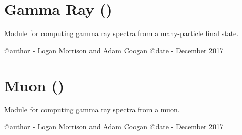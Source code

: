 \documentclass[letterpaper,10pt,english]{sphinxmanual}
\begin{document}
\section{Gamma Ray ()}
\label{\detokenize{modules:module-hazma.gamma_ray}}\label{\detokenize{modules:gamma-ray-hazma-gamma-ray}}
Module for computing gamma ray spectra from a many-particle final state.

@author - Logan Morrison and Adam Coogan
@date - December 2017


\section{Muon ()}
\label{\detokenize{modules:muon-hazma-muon}}\label{\detokenize{modules:module-hazma.muon}}
Module for computing gamma ray spectra from a muon.

@author - Logan Morrison and Adam Coogan
@date - December 2017
\end{document}
